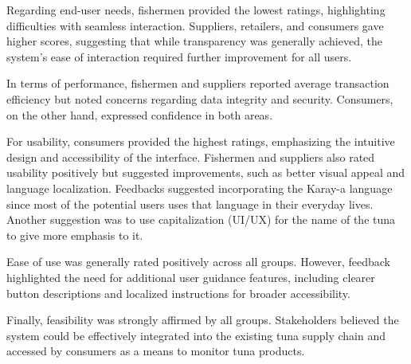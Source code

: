 \noindent Regarding end-user needs, fishermen provided the lowest ratings, highlighting difficulties with seamless interaction. Suppliers, retailers, and consumers gave higher scores, suggesting that while transparency was generally achieved, the system's ease of interaction required further improvement for all users.

\noindent In terms of performance, fishermen and suppliers reported average transaction efficiency but noted concerns regarding data integrity and security. Consumers, on the other hand, expressed confidence in both areas.

\noindent For  usability, consumers provided the highest ratings, emphasizing the intuitive design and accessibility of the interface. Fishermen and suppliers also rated usability positively but suggested improvements, such as better visual appeal and language localization. Feedbacks suggested incorporating the Karay-a language since most of the potential users uses that language in their everyday lives. Another suggestion was to use capitalization (UI/UX) for the name of the tuna to give more emphasis to it.  

\noindent Ease of use was generally rated positively across all groups. However, feedback highlighted the need for additional user guidance features, including clearer button descriptions and localized instructions for broader accessibility.

\noindent Finally, feasibility was strongly affirmed by all groups. Stakeholders believed the system could be effectively integrated into the existing tuna supply chain and accessed by consumers as a means to monitor tuna products.
	


